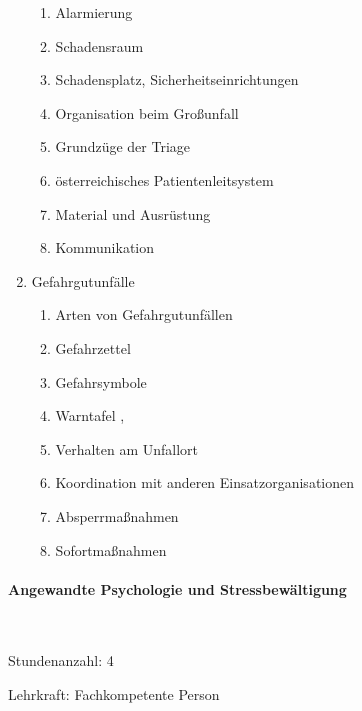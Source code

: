 \begin{WidePar}
\begin{multicols}{2}
\begin{enumerate}
\begin{enumerate}
      \item      Alarmierung \dotfill {}
      \item      Schadensraum \dotfill {}
      \item      Schadensplatz, Sicherheitseinrichtungen \dotfill {}
      \item      Organisation beim Großunfall \dotfill {}
      \item      Grundzüge der Triage \dotfill {}
      \item      österreichisches Patientenleitsystem \dotfill {}
      \item      Material und Ausrüstung \dotfill {}
      \item      Kommunikation \dotfill {}
    \end{enumerate}
    \item
    Gefahrgutunfälle
    \begin{enumerate}
      \item      Arten von Gefahrgutunfällen \dotfill {}
      \item      Gefahrzettel \dotfill {}
      \item      Gefahrsymbole \dotfill {}
      \item      Warntafel \dotfill {},
      \item
      Verhalten am Unfallort \dotfill {}
      \item      Koordination mit anderen Einsatzorganisationen \dotfill {}
      \item      Absperrmaßnahmen \dotfill {}
      \item      Sofortmaßnahmen \dotfill {}
    \end{enumerate}
  \end{enumerate}
  
  \paragraph{Angewandte Psychologie und Stressbewältigung}~
    
  \begin{inparadesc}
    \item[Stundenanzahl:]  4
    \item[Lehrkraft:]  Fachkompetente Person
  \end{inparadesc}
  

\end{multicols}
\end{WidePar}
